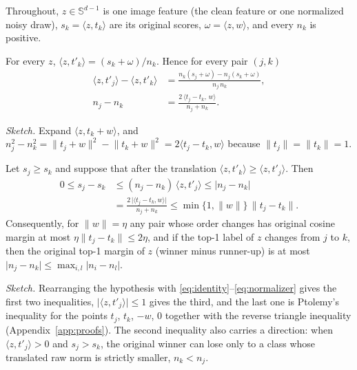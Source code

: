 
Throughout, $z\in\mathbb S^{d-1}$ is one image feature (the clean feature or
one normalized noisy draw), $s_k=\langle z,t_k\rangle$ are its original scores,
$\omega=\langle z,w\rangle$, and every $n_k$ is positive.

\begin{proposition}
\label{prop:identity}
For every $z$, $\langle z,t'_k\rangle=(s_k+\omega)/n_k$. Hence for every pair
$(j,k)$
\begin{align}
\langle z,t'_j\rangle-\langle z,t'_k\rangle
&=\frac{n_k(s_j+\omega)-n_j(s_k+\omega)}{n_j\,n_k},
\label{eq:identity}\\
n_j-n_k&=\frac{2\,\langle t_j-t_k,\,w\rangle}{n_j+n_k}.
\label{eq:normalizer}
\end{align}
\end{proposition}
\noindent\emph{Sketch.} Expand $\langle z,t_k+w\rangle$, and
$n_j^2-n_k^2=\lVert t_j+w\rVert^2-\lVert t_k+w\rVert^2=2\langle t_j-t_k,w\rangle$
because $\lVert t_j\rVert=\lVert t_k\rVert=1$.

\begin{proposition}
\label{prop:flip}
Let $s_j\ge s_k$ and suppose that after the translation
$\langle z,t'_k\rangle\ge\langle z,t'_j\rangle$. Then
\begin{align}
0\le s_j-s_k
&\le (n_j-n_k)\,\langle z,t'_j\rangle
\le\lvert n_j-n_k\rvert
\nonumber\\
&=\frac{2\,\lvert\langle t_j-t_k,w\rangle\rvert}{n_j+n_k}
\le\min\{1,\lVert w\rVert\}\,\lVert t_j-t_k\rVert .
\label{eq:flip}
\end{align}
Consequently, for $\lVert w\rVert=\eta$ any pair whose order changes has
original cosine margin at most $\eta\lVert t_j-t_k\rVert\le 2\eta$, and if
the top-1 label of $z$ changes from $j$ to $k$, then the original top-1 margin
of $z$ (winner minus runner-up) is at most
$\lvert n_j-n_k\rvert\le\max_{i,l}\lvert n_i-n_l\rvert$.
\end{proposition}
\noindent\emph{Sketch.} Rearranging the hypothesis with
\eqref{eq:identity}--\eqref{eq:normalizer} gives the first two inequalities,
$\lvert\langle z,t'_j\rangle\rvert\le1$ gives the third, and the last one is
Ptolemy's inequality for the points $t_j$, $t_k$, $-w$, $0$ together with the
reverse triangle inequality (Appendix~\ref{app:proofs}). The second inequality
also carries a direction: when $\langle z,t'_j\rangle>0$ and $s_j>s_k$, the original winner
can lose only to a class whose translated raw norm is strictly smaller,
$n_k<n_j$.

